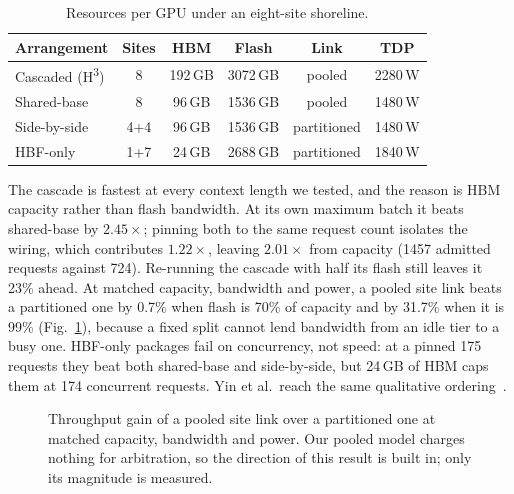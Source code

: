 \documentclass[conference,10pt]{IEEEtran}
\newcommand{\Hthree}{H\textsuperscript{3}}
\begin{document}
\begin{table}[t]
\centering
\caption{Resources per GPU under an eight-site shoreline.}
\label{tab:arrangements}
\footnotesize
\setlength{\tabcolsep}{4pt}
\begin{tabular}{@{}lccccc@{}}
\toprule
\textbf{Arrangement} & \textbf{Sites} & \textbf{HBM} & \textbf{Flash} & \textbf{Link} & \textbf{TDP} \\
\midrule
Cascaded (\Hthree{}) & 8   & 192\,GB & 3072\,GB & pooled      & 2280\,W \\
Shared-base          & 8   & 96\,GB  & 1536\,GB & pooled      & 1480\,W \\
Side-by-side         & 4+4 & 96\,GB  & 1536\,GB & partitioned & 1480\,W \\
HBF-only             & 1+7 & 24\,GB  & 2688\,GB & partitioned & 1840\,W \\
\bottomrule
\end{tabular}
\end{table}

The cascade is fastest at every context length we tested, and the reason is HBM
capacity rather than flash bandwidth. At its own maximum batch it beats
shared-base by $2.45\times$; pinning both to the same request count isolates the
wiring, which contributes $1.22\times$, leaving $2.01\times$ from capacity (1457
admitted requests against 724). Re-running the cascade with half its flash still
leaves it 23\% ahead. At matched capacity, bandwidth and power, a pooled site link
beats a partitioned one by 0.7\% when flash is 70\% of capacity and by 31.7\% when
it is 99\% (Fig.~\ref{fig:pooling}), because a fixed split cannot lend bandwidth from an idle tier to a busy
one. HBF-only packages fail on concurrency, not speed: at a pinned 175 requests
they beat both shared-base and side-by-side, but 24\,GB of HBM caps them at 174
concurrent requests. Yin et al.\ reach the same qualitative ordering~\cite{yin2026hbfapps}.

\begin{figure}[t]
\centering
{}
\caption{Throughput gain of a pooled site link over a partitioned one at matched
capacity, bandwidth and power. Our pooled model charges nothing for arbitration,
so the direction of this result is built in; only its magnitude is measured.}
\label{fig:pooling}
\end{figure}
\end{document}
